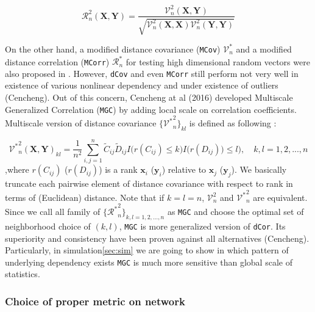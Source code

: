 \documentclass[12pt]{article}
\theoremstyle{definition}
\begin{document}
\begin{equation}	 
\mathcal{R}_{n}^{2} (\boldsymbol{X}, \boldsymbol{Y}) = \frac{\mathcal{V}^2_{n} (\boldsymbol{X}, \boldsymbol{Y}) }{\sqrt{\mathcal{V}^2_{n} (\boldsymbol{X}, \boldsymbol{X}) \mathcal{V}^2_{n} (\boldsymbol{Y}, \boldsymbol{Y}) } }
\end{equation}
	
On the other hand, a modified distance covariance (\texttt{MCov}) $\mathcal{V}^*_{n}$ and a modified distance correlation (\texttt{MCorr}) $\mathcal{R}^{*}_{n}$ for testing high dimensional random vectors were also proposed in \cite{szekely2013distance}.   
However, \texttt{dCov} and even \texttt{MCorr} still perform not very well in existence of various nonlinear dependency and under existence of outliers (Cencheng). Out of this concern, Cencheng at al (2016) developed Multiscale Generalized Correlation (\texttt{MGC}) by adding local scale on correlation coefficients. Multiscale version of distance covariance $\{ { {\mathcal{V}^{*}}^2_{n} }   \}_{kl}$ is defined as following : 
	
\begin{equation}
\label{eq:MGC}
{\mathcal{V}^{*}}^2_{n} (\boldsymbol{X}, \boldsymbol{Y})_{kl} = \frac{1}{n^2} \sum\limits_{i,j=1}^{n} \tilde{C}_{ij} \tilde{D}_{ij} I \big( r(C_{ij}) \leq k \big) I \big( r(D_{ij})) \leq l  \big), \quad k,l=1,2,..., n 
\end{equation}
,where $r(C_{ij})$ ($r(D_{ij})$) is a rank $\mathbf{x}_{i}$ ($\mathbf{y}_{i}$) relative to $\mathbf{x}_{j}$ ($\mathbf{y}_{j}$). We basically truncate each pairwise element of distance covariance with respect to rank in terms of (Euclidean) distance. Note that if $k=l=n$, $\mathcal{V}^2_{n}$ and ${\mathcal{V}^{*}}^2_{n}$ are equivalent. Since we call all family of $\{  {\mathcal{R}^{*}}^2_{n} \}_{k,l = 1,2,...,n}$ as \texttt{MGC} and choose the optimal set of neighborhood choice of $(k,l)$, \texttt{MGC} is more generalized version of \texttt{dCor}. Its superiority and consistency have been proven against all alternatives (Cencheng). Particularly, in simulation\ref{sec:sim} we are going to show in which pattern of underlying dependency exists \texttt{MGC} is much more sensitive than global scale of statistics. 
		
\subsubsection{Choice of proper metric on network}
\end{document}

